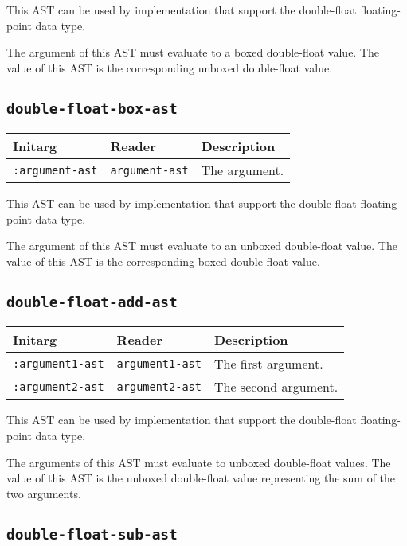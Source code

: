 This AST can be used by implementation that support the double-float
floating-point data type.  

The argument of this AST must evaluate to a boxed double-float value.
The value of this AST is the corresponding unboxed double-float value.

\subsection{\texttt{double-float-box-ast}}
\label{sec-ast-double-float-box}

\begin{tabular}{|l|l|l|}
\hline
Initarg & Reader & Description\\
\hline\hline
\texttt{:argument-ast} & \texttt{argument-ast} & The argument.\\
\hline
\end{tabular}

This AST can be used by implementation that support the double-float
floating-point data type.  

The argument of this AST must evaluate to an unboxed double-float
value.  The value of this AST is the corresponding boxed double-float
value.

\subsection{\texttt{double-float-add-ast}}
\label{sec-ast-double-float-add}

\begin{tabular}{|l|l|l|}
\hline
Initarg & Reader & Description\\
\hline\hline
\texttt{:argument1-ast} & \texttt{argument1-ast} & The first argument.\\
\hline
\texttt{:argument2-ast} & \texttt{argument2-ast} & The second argument.\\
\hline
\end{tabular}

This AST can be used by implementation that support the double-float
floating-point data type.  

The arguments of this AST must evaluate to unboxed double-float
values.  The value of this AST is the unboxed double-float value
representing the sum of the two arguments.

\subsection{\texttt{double-float-sub-ast}}
\label{sec-ast-double-float-sub}

